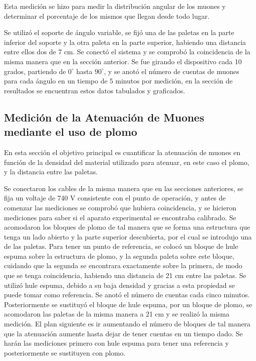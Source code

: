 \documentclass[a4paper,10pt]{article}
\numberwithin{equation}{section}
\begin{document}
Esta medición se hizo para medir la distribución angular de los muones y determinar 
el porcentaje de los mismos que llegan desde todo lugar.

\vspace{.3cm}

Se utilizó el soporte de ángulo variable, se fijó una de las paletas en la parte 
inferior del soporte y la otra paleta en la parte superior, habiendo una distancia 
entre ellos dos de 7 cm. Se conectó el sistema y se comprobó la coincidencia
de la misma manera que en la sección anterior. Se fue girando el dispositivo cada 
10 grados, partiendo de $0^\circ$ hasta $90^\circ$, y se anotó el número de cuentas 
de muones para cada ángulo en un tiempo de 5 minutos por medición, en la sección
de resultados se encuentran estos datos tabulados y graficados.

\subsection{Medición de la Atenuación de Muones mediante el uso de plomo}

En esta sección el objetivo principal es cuantificar la atenuación de muones en 
función de la densidad del material utilizado para atenuar, en este caso el plomo, 
y la distancia entre las paletas. 

\vspace{.3cm}

Se conectaron los cables de la misma manera que en
las secciones anteriores, se fija un voltaje de 740 V consistente con el punto de 
operación, y antes de comenzar las 
mediciones se comprobó que hubiera coincidencia, y se hicieron mediciones para saber
si el aparato experimental se encontraba calibrado. Se acomodaron los bloques de plomo 
de tal manera que se forma una estructura que tenga un lado abierto y la parte 
superior descubierta, por el cual se introdujo una de las paletas. Para tener un 
punto de referencia, se colocó un bloque de hule espuma sobre la estructura de plomo,
y la segunda paleta sobre este bloque, cuidando que la segunda se encontrara 
exactamente sobre la primera, de modo que se tenga coincidencia, habiendo una 
distancia de 21 cm entre las paletas. Se utilizó hule espuma, debido a su baja 
densidad y gracias a esta propiedad se puede tomar como referencia. Se anotó el 
número de cuentas cada cinco minutos. Posteriormente se sustituyó el bloque de hule
espuma, por un bloque de plomo, se acomodaron las paletas de la misma manera a 21 cm
y se realizó la misma medición. El plan siguiente es ir aumentando el número de bloques de tal
manera que la atenuación aumente hasta dejar de tener cuentas en un tiempo dado. 
Se harán las mediciones primero con hule espuma para tener una referencia y
posteriormente se sustituyen con plomo.
\end{document}
